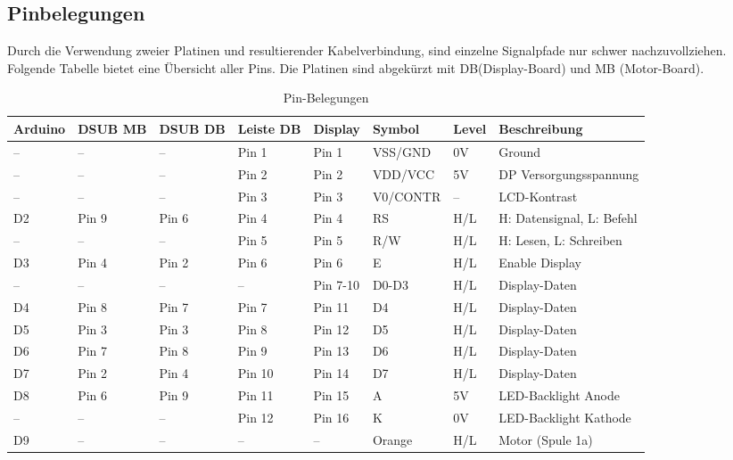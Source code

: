 \documentclass[11pt, titlepage, fleqn]{report}
\begin{document}
			\subsection{Pinbelegungen}
			\label{sec:Gesamtschaltung}
				Durch die Verwendung zweier Platinen und resultierender Kabelverbindung, sind einzelne Signalpfade nur schwer nachzuvollziehen. Folgende Tabelle bietet eine Übersicht aller Pins. Die Platinen sind abgekürzt mit DB(Display-Board) und MB (Motor-Board).
				\begin{table}[htbp]
					\centering
					\caption[Pin-Belegungen]{Pin-Belegungen}
					\label{tab:tabDisplay}
					\begin{tabular}{llllllll}
					\toprule
						\textbf{Arduino} & \textbf{DSUB MB} 	  & \textbf{DSUB DB} 	& \textbf{Leiste DB} 	& \textbf{Display}	 & \textbf{Symbol}   & \textbf{Level} & \textbf{Beschreibung}\\
					\midrule
						--		&--			&--		& Pin 1		& Pin 1		& VSS/GND	& 0V	& Ground\\
						--		&--			&--		& Pin 2		& Pin 2		& VDD/VCC	& 5V	& DP Versorgungsspannung\\
						--		&--			&--		& Pin 3		& Pin 3		& V0/CONTR	& --	& LCD-Kontrast\\
						D2		& Pin 9		& Pin 6	& Pin 4		& Pin 4		& RS		& H/L	& H: Datensignal, L: Befehl\\
						--		&--			&--		& Pin 5		& Pin 5		& R/W		& H/L	& H: Lesen, L: Schreiben\\
						D3		& Pin 4		& Pin 2	& Pin 6		& Pin 6		& E			& H/L	& Enable Display\\
						--		&--			&--		& --		& Pin 7-10	& D0-D3		& H/L	& Display-Daten\\
						D4		& Pin 8		& Pin 7	& Pin 7		& Pin 11	& D4		& H/L	& Display-Daten\\
						D5		& Pin 3		& Pin 3	& Pin 8		& Pin 12	& D5		& H/L	& Display-Daten\\
						D6		& Pin 7		& Pin 8	& Pin 9		& Pin 13	& D6		& H/L	& Display-Daten\\
						D7		& Pin 2		& Pin 4	& Pin 10	& Pin 14	& D7		& H/L	& Display-Daten\\
						D8		& Pin 6		& Pin 9	& Pin 11	& Pin 15	& A			& 5V	& LED-Backlight Anode\\
						--		&--			&--		& Pin 12	& Pin 16	& K			& 0V	& LED-Backlight Kathode\\
						D9		&--			&--		& --		& --		& Orange	& H/L	& Motor (Spule 1a)\\

\end{tabular}
\end{table}
\end{document}
